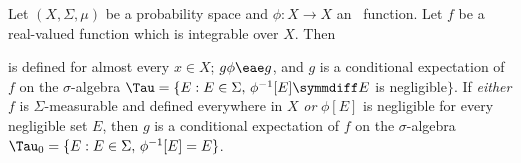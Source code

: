 Let $(X,\Sigma,\mu)$ be a probability space and
$\phi:X\to X$ an \imp\ function.
Let $f$ be a real-valued function which is integrable over $X$.   Then


\noindent is defined for almost every $x\in X$;  $g\phi\eae g$, and $g$
is a conditional expectation of $f$ on the $\sigma$-algebra
$\Tau=\{E:E\in\Sigma,\,\phi^{-1}[E]\symmdiff E$ is negligible$\}$.
If {\it either} $f$ is $\Sigma$-measurable and defined everywhere in $X$
{\it or} $\phi[E]$ is negligible for every negligible set $E$, then $g$
is a conditional expectation of $f$ on the $\sigma$-algebra
$\Tau_0=\{E:E\in\Sigma,\,\phi^{-1}[E]=E\}$.

